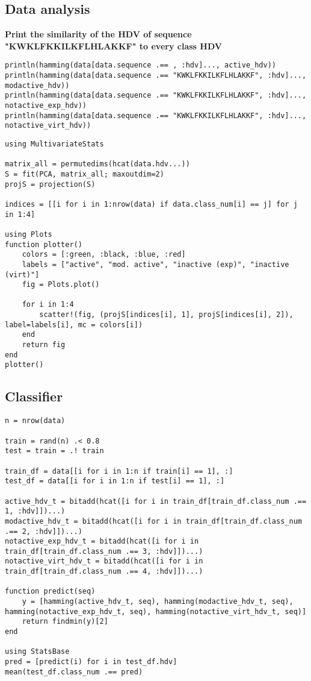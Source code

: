 \subsection{Data analysis}
\textbf{Print the similarity of the HDV of sequence "KWKLFKKILKFLHLAKKF" to every class HDV}
\begin{verbatim}
println(hamming(data[data.sequence .== , :hdv]..., active_hdv))
println(hamming(data[data.sequence .== "KWKLFKKILKFLHLAKKF", :hdv]..., modactive_hdv))
println(hamming(data[data.sequence .== "KWKLFKKILKFLHLAKKF", :hdv]..., notactive_exp_hdv))
println(hamming(data[data.sequence .== "KWKLFKKILKFLHLAKKF", :hdv]..., notactive_virt_hdv))
\end{verbatim}
\begin{verbatim}
using MultivariateStats

matrix_all = permutedims(hcat(data.hdv...))
S = fit(PCA, matrix_all; maxoutdim=2)
projS = projection(S)

indices = [[i for i in 1:nrow(data) if data.class_num[i] == j] for j in 1:4]

using Plots
function plotter()
    colors = [:green, :black, :blue, :red]
    labels = ["active", "mod. active", "inactive (exp)", "inactive (virt)"]
    fig = Plots.plot()

    for i in 1:4
        scatter!(fig, (projS[indices[i], 1], projS[indices[i], 2]), label=labels[i], mc = colors[i])
    end
    return fig
end
plotter()
\end{verbatim}
\subsection{Classifier}
\begin{verbatim}
n = nrow(data)

train = rand(n) .< 0.8
test = train = .! train

train_df = data[[i for i in 1:n if train[i] == 1], :]
test_df = data[[i for i in 1:n if test[i] == 1], :]

active_hdv_t = bitadd(hcat([i for i in train_df[train_df.class_num .== 1, :hdv]])...)
modactive_hdv_t = bitadd(hcat([i for i in train_df[train_df.class_num .== 2, :hdv]])...)
notactive_exp_hdv_t = bitadd(hcat([i for i in train_df[train_df.class_num .== 3, :hdv]])...)
notactive_virt_hdv_t = bitadd(hcat([i for i in train_df[train_df.class_num .== 4, :hdv]])...)

function predict(seq)
    y = [hamming(active_hdv_t, seq), hamming(modactive_hdv_t, seq), hamming(notactive_exp_hdv_t, seq), hamming(notactive_virt_hdv_t, seq)]
    return findmin(y)[2]
end

using StatsBase
pred = [predict(i) for i in test_df.hdv]
mean(test_df.class_num .== pred)
\end{verbatim}